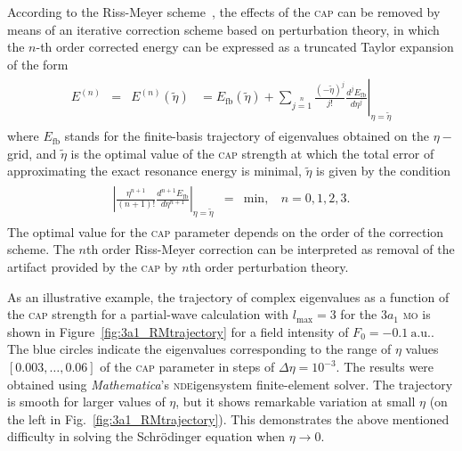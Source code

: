 According to the Riss-Meyer scheme~\cite{RissMeyer_1993}, the effects
of the \textsc{cap} can be removed by means of an iterative correction
scheme based on perturbation theory, in which the $n$-th order
corrected energy can be expressed as a truncated Taylor expansion of
the form
%
\begin{eqnarray}
  \begin{split}
    E^{(n)} & = & E^{(n)}(\tilde{\eta}) & =
    E_{\mathrm{fb}}(\tilde{\eta}) +
    \sum\limits_{j=1}\limits^{n}
    \left.
    \frac{(-\tilde{\eta})^{j}}{j!} \frac{d^{j}E_{\mathrm{fb}}}{d\eta^{j}}
    \right|_{\eta=\tilde{\eta}}
  \end{split}
  \label{eq:RM_scheme}
\end{eqnarray}
%
where $E_{\mathrm{fb}}$ stands for the finite-basis trajectory of
eigenvalues obtained on the $\eta-$grid, and $\tilde{\eta}$ is the
optimal value of the \textsc{cap} strength at which the total error of
approximating the exact resonance energy is minimal, $\tilde{\eta}$ is
given by the condition
%
\begin{eqnarray}
  \begin{split}
    \left| \frac{\eta^{n+1}}{(n + 1)!} \frac{d^{n+1} E_{\mathrm{fb}}}{d\eta^{n+1}}
    \right|_{\eta=\tilde{\eta}} & = & \mathrm{min}, ~~~~ n = 0,1,2,3.
  \end{split}
  \label{eq:optimal_eta}
\end{eqnarray}
%
The optimal value for the \textsc{cap} parameter depends on the order
of the correction scheme. The $n$th order Riss-Meyer correction can be
interpreted as removal of the artifact provided by the \textsc{cap} by
$n$th order perturbation theory.

As an illustrative example, the trajectory of complex eigenvalues as a
function of the \textsc{cap} strength for a partial-wave calculation
with $l_{\mathrm{max}}=3$ for the $3a_{1}$ \textsc{mo} is shown in
Figure~\ref{fig:3a1_RMtrajectory} for a field intensity of $F_{0} =
-0.1\ \mathrm{a.u.}$. The blue circles indicate the eigenvalues
corresponding to the range of $\eta$ values $[0.003, \dots, 0.06]$ of
the \textsc{cap} parameter in steps of $\Delta\eta = 10^{-3}$. The
results were obtained using \emph{Mathematica}'s
\textsc{nde}igensystem finite-element solver. The trajectory is smooth
for larger values of $\eta$, but it shows remarkable variation at
small $\eta$ (on the left in Fig.~\ref{fig:3a1_RMtrajectory}). This
demonstrates the above mentioned difficulty in solving the
Schr\"{o}dinger equation when $\eta\to 0$.

